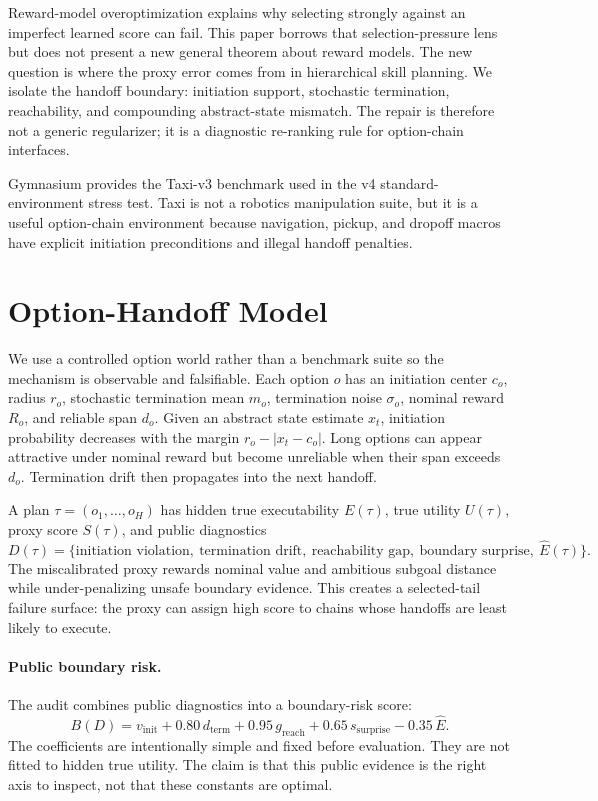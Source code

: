 \documentclass{article}
\begin{document}
Reward-model overoptimization \citep{gao2023scaling} explains why selecting strongly against an imperfect learned score can fail. This paper borrows that selection-pressure lens but does not present a new general theorem about reward models. The new question is where the proxy error comes from in hierarchical skill planning. We isolate the handoff boundary: initiation support, stochastic termination, reachability, and compounding abstract-state mismatch. The repair is therefore not a generic regularizer; it is a diagnostic re-ranking rule for option-chain interfaces.

Gymnasium \citep{towers2024gymnasium} provides the Taxi-v3 benchmark used in the v4 standard-environment stress test. Taxi is not a robotics manipulation suite, but it is a useful option-chain environment because navigation, pickup, and dropoff macros have explicit initiation preconditions and illegal handoff penalties.

\section{Option-Handoff Model}

We use a controlled option world rather than a benchmark suite so the mechanism is observable and falsifiable. Each option \(o\) has an initiation center \(c_o\), radius \(r_o\), stochastic termination mean \(m_o\), termination noise \(\sigma_o\), nominal reward \(R_o\), and reliable span \(d_o\). Given an abstract state estimate \(x_t\), initiation probability decreases with the margin \(r_o-|x_t-c_o|\). Long options can appear attractive under nominal reward but become unreliable when their span exceeds \(d_o\). Termination drift then propagates into the next handoff.

A plan \(\tau=(o_1,\ldots,o_H)\) has hidden true executability \(E(\tau)\), true utility \(U(\tau)\), proxy score \(S(\tau)\), and public diagnostics
\[
D(\tau)=
\{\text{initiation violation},\ \text{termination drift},\ \text{reachability gap},\ \text{boundary surprise},\ \widehat E(\tau)\}.
\]
The miscalibrated proxy rewards nominal value and ambitious subgoal distance while under-penalizing unsafe boundary evidence. This creates a selected-tail failure surface: the proxy can assign high score to chains whose handoffs are least likely to execute.

\paragraph{Public boundary risk.}
The audit combines public diagnostics into a boundary-risk score:
\[
B(D)=v_{\mathrm{init}} + 0.80\,d_{\mathrm{term}} + 0.95\,g_{\mathrm{reach}} +
0.65\,s_{\mathrm{surprise}} - 0.35\,\widehat E .
\]
The coefficients are intentionally simple and fixed before evaluation. They are not fitted to hidden true utility. The claim is that this public evidence is the right axis to inspect, not that these constants are optimal.
\end{document}
